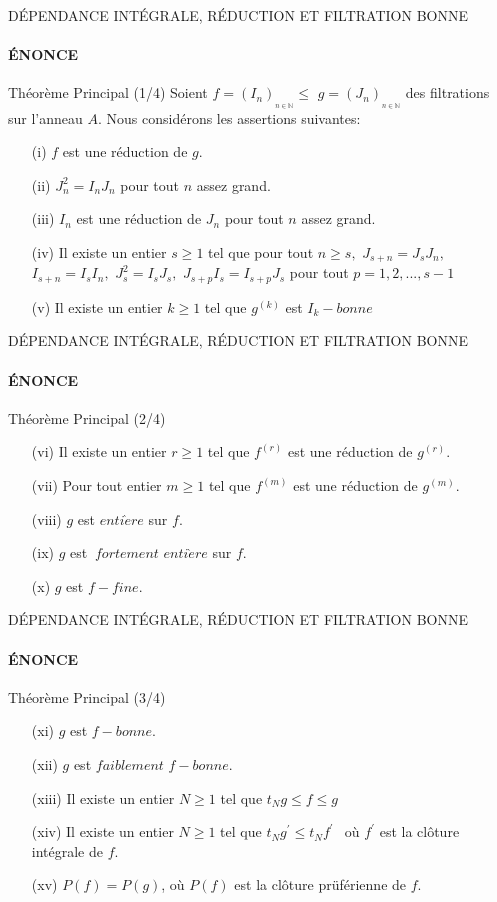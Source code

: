 \documentclass[11pt,a4paper]{beamer}
\begin{document}
\begin{frame}{DÉPENDANCE INTÉGRALE, RÉDUCTION ET FILTRATION BONNE}
	\framesubtitle{ÉNONCE}
	\begin{block}{Théorème Principal (1/4)}
	Soient $f=(I_{n})_{_{n\in \mathbb{N}}}\leq $ $g=(J_{n})_{_{n\in \mathbb{N}}}$ des filtrations sur l'anneau $A.$ Nous considérons les assertions suivantes:
		\begin{enumerate}
			\item[(i)] $f$ est une réduction de $g.$
			\item[(ii)] $J_{n}^{2}=I_{n}J_{n}$ pour tout $n$ assez grand.
			\item[(iii)] $I_{n}$ est une réduction de $J_{n}$ pour tout $n$ assez grand.
			\item[(iv)] Il existe un entier $s\geq 1$ tel que pour tout $n\geq s,$ $J_{s+n}=J_{s}J_{n},$
			$I_{s+n}=I_{s}I_{n},$ $J_{s}^{2}=I_{s}J_{s},$ $J_{s+p}I_{s}=I_{s+p}J_{s}$ pour tout $p=1,2,...,s-1$
			\item[(v)] Il existe un entier $k\geq 1$ tel que $g^{(k)}$ est $I_{k}-bonne$
		\end{enumerate}
	\end{block}
\end{frame}

\begin{frame}{DÉPENDANCE INTÉGRALE, RÉDUCTION ET FILTRATION BONNE}
	\framesubtitle{ÉNONCE}
	\begin{block}{Théorème Principal (2/4)}
		\begin{enumerate}
	\item[(vi)] Il existe un entier $r\geq 1$ tel que $f^{(r)}$ est une réduction de $g^{(r)}.$
			\item[(vii)] Pour tout entier $m\geq 1$ tel que $f^{(m)}$ est une réduction de $g^{(m)}.$
			\item[(viii)] $g$ est $enti\grave{e}re$ sur $f.$
			\item[(ix)] $g$ est $\ fortement$ $enti\grave{e}re$ sur $f.$
			\item[(x)] $g$ est $f-fine.$
		\end{enumerate}
	\end{block}
\end{frame}

\begin{frame}{DÉPENDANCE INTÉGRALE, RÉDUCTION ET FILTRATION BONNE}
	\framesubtitle{ÉNONCE}
	\begin{block}{Théorème Principal (3/4)}
		\begin{enumerate}
			\item[(xi)] $g$ est $f-bonne.$
			\item[(xii)] $g$ est $faiblement$ $f-bonne.$
			\item[(xiii)] Il existe un entier $N\geq 1$ tel que $t_{N}g\leq f\leq g$
			\item[(xiv)] Il existe un entier $N\geq 1$ tel que $t_{N}g^{\prime }\leq
			t_{N}f^{\prime \text{ }}$ o\`{u} $f^{\prime }$ est la clôture intégrale de $f.$
			\item[(xv)] $P(f)=P(g)$, o\`{u} $P(f)$ est la clôture prüférienne de $f.$
		\end{enumerate}
	\end{block}
\end{frame}
\end{document}

